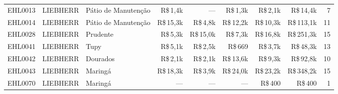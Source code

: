 \begin{table}[H]
\begin{tabular}{@{}ll>{\raggedright\arraybackslash}p{2.2cm}rrrrrr@{}}
EHL0013 & LIEBHERR & Pátio de Manutenção & R\$\,1,4k & --- & R\$\,1,3k & R\$\,2,1k & R\$\,14,4k & 7 \\
EHL0014 & LIEBHERR & Pátio de Manutenção & R\$\,15,3k & R\$\,4,8k & R\$\,12,2k & R\$\,10,3k & R\$\,113,1k & 11 \\
EHL0028 & LIEBHERR & Prudente & R\$\,5,3k & R\$\,15,0k & R\$\,7,3k & R\$\,16,8k & R\$\,251,3k & 15 \\
EHL0041 & LIEBHERR & Tupy & R\$\,5,1k & R\$\,2,5k & R\$\,669 & R\$\,3,7k & R\$\,48,3k & 13 \\
EHL0042 & LIEBHERR & Dourados & R\$\,2,1k & R\$\,2,1k & R\$\,13,6k & R\$\,9,3k & R\$\,92,8k & 10 \\
EHL0043 & LIEBHERR & Maringá & R\$\,18,3k & R\$\,3,9k & R\$\,24,0k & R\$\,23,2k & R\$\,348,2k & 15 \\
EHL0070 & LIEBHERR & Maringá & --- & --- & --- & R\$\,400 & R\$\,400 & 1 \\
\bottomrule
\end{tabular}
\end{table}

